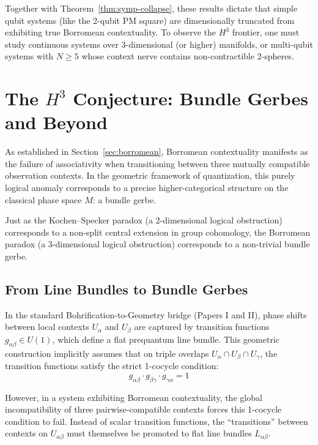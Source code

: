 \documentclass[11pt]{article}
\begin{document}
Together with Theorem~\ref{thm:symp-collapse}, these results dictate that simple qubit systems (like the 2-qubit PM square) are dimensionally truncated from exhibiting true Borromean contextuality. To observe the $H^3$ frontier, one must study continuous systems over 3-dimensional (or higher) manifolds, or multi-qubit systems with $N \geq 5$ whose context nerve contains non-contractible 2-spheres.

\section{The $H^3$ Conjecture: Bundle Gerbes and Beyond}
\label{sec:H3}

As established in Section~\ref{sec:borromean}, Borromean contextuality manifests as the failure of associativity when transitioning between three mutually compatible observation contexts. In the geometric framework of quantization, this purely logical anomaly corresponds to a precise higher-categorical structure on the classical phase space $M$: a bundle gerbe.

Just as the Kochen--Specker paradox (a 2-dimensional logical obstruction) corresponds to a non-split central extension in group cohomology, the Borromean paradox (a 3-dimensional logical obstruction) corresponds to a non-trivial bundle gerbe.

\subsection{From Line Bundles to Bundle Gerbes}

In the standard Bohrification-to-Geometry bridge (Papers I and II), phase shifts between local contexts $U_\alpha$ and $U_\beta$ are captured by transition functions $g_{\alpha\beta} \in U(1)$, which define a flat prequantum line bundle. This geometric construction implicitly assumes that on triple overlaps $U_{\alpha} \cap U_{\beta} \cap U_{\gamma}$, the transition functions satisfy the strict 1-cocycle condition:
\[
    g_{\alpha\beta} \cdot g_{\beta\gamma} \cdot g_{\gamma\alpha} = 1
\]

However, in a system exhibiting Borromean contextuality, the global incompatibility of three pairwise-compatible contexts forces this 1-cocycle condition to fail. Instead of scalar transition functions, the ``transitions'' between contexts on $U_{\alpha\beta}$ must themselves be promoted to flat line bundles $L_{\alpha\beta}$.
\end{document}
